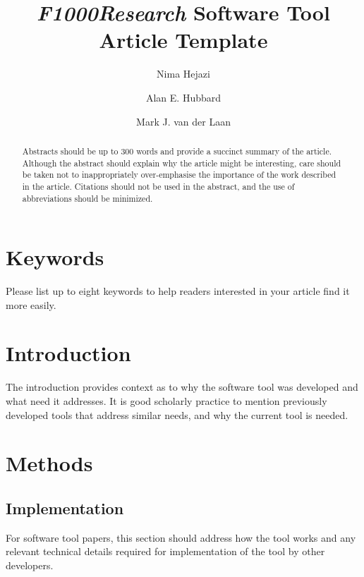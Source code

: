 \documentclass[9pt,a4paper,]{extarticle}
\theoremstyle{definition}
\theoremstyle{definition}
\theoremstyle{remark}
\begin{document}
\pagestyle{front}

\title{\emph{F1000Research} Software Tool Article Template}

\author[1]{Nima Hejazi}
\author[2]{Alan E. Hubbard}
\author[2]{Mark J. van der Laan}

\maketitle
\thispagestyle{front}

\begin{abstract}
Abstracts should be up to 300 words and provide a succinct summary of
the article. Although the abstract should explain why the article might
be interesting, care should be taken not to inappropriately
over-emphasise the importance of the work described in the article.
Citations should not be used in the abstract, and the use of
abbreviations should be minimized.
\end{abstract}

\section*{Keywords}
Please list up to eight keywords to help readers interested in your
article find it more easily.


\clearpage
\pagestyle{main}

\section{Introduction}\label{introduction}

The introduction provides context as to why the software tool was
developed and what need it addresses. It is good scholarly practice to
mention previously developed tools that address similar needs, and why
the current tool is needed.

\section{Methods}\label{methods}

\subsection{Implementation}\label{implementation}

For software tool papers, this section should address how the tool works
and any relevant technical details required for implementation of the
tool by other developers.
\end{document}
